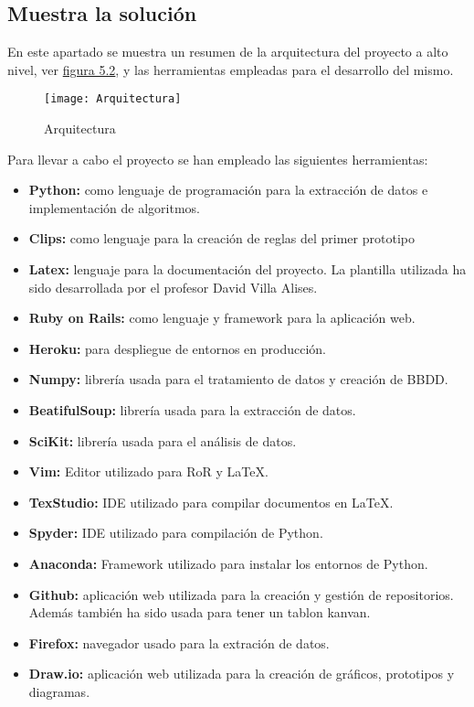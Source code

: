 \subsection{Muestra la solución}
En este apartado se muestra un resumen de la arquitectura del proyecto a alto nivel, ver \hyperref[fig:Arquitectura proyecto]{figura 5.2}, y las herramientas empleadas para el desarrollo del mismo.

\begin{figure}[htb]
  \centering
    \texttt{[image: Arquitectura]}
  \caption[Arquitectura]{Arquitectura}
  \label{fig:Arquitectura proyecto}
\end{figure}


Para llevar a cabo el proyecto se han empleado las siguientes herramientas:
\begin{itemize}
  \item \textbf{Python:} como lenguaje de programación para la extracción de datos e implementación
    de algoritmos.
  \item \textbf{Clips:} como lenguaje para la creación de reglas del primer prototipo
  \item \textbf{Latex:} lenguaje para la documentación del proyecto. La plantilla utilizada
    ha sido desarrollada por el profesor David Villa Alises.
  \item \textbf{Ruby on Rails:} como lenguaje y framework para la aplicación web.
  \item \textbf{Heroku:} para despliegue de entornos en producción.
  \item \textbf{Numpy:} librería usada para el tratamiento de datos y creación de BBDD.
  \item \textbf{BeatifulSoup:} librería usada para la extracción de datos.
  \item \textbf{SciKit:} librería usada para el análisis de datos.
  \item \textbf{Vim:} Editor utilizado para RoR y LaTeX.
  \item \textbf{TexStudio:} IDE utilizado para compilar documentos en LaTeX.
  \item \textbf{Spyder:} IDE utilizado para compilación de Python.
  \item \textbf{Anaconda:} Framework utilizado para instalar los entornos de Python.
  \item \textbf{Github:} aplicación web utilizada para la creación y gestión de repositorios.
    Además también ha sido usada para tener un tablon kanvan.
  \item \textbf{Firefox:} navegador usado para la extración de datos.
  \item \textbf{Draw.io:} aplicación web utilizada para la creación de gráficos, prototipos
    y diagramas.
\end{itemize}

